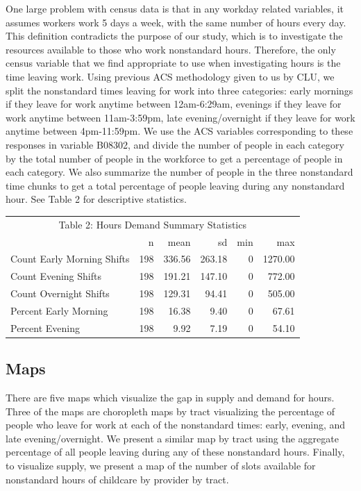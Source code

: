 \documentclass[10pt,letterpaper]{article}
\begin{document}
One large problem with census data is that in any workday related
variables, it assumes workers work 5 days a week, with the same number
of hours every day. This definition contradicts the purpose of our
study, which is to investigate the resources available to those who work
nonstandard hours. Therefore, the only census variable that we find
appropriate to use when investigating hours is the time leaving work.
Using previous ACS methodology given to us by CLU, we split the
nonstandard times leaving for work into three categories: early mornings
if they leave for work anytime between 12am-6:29am, evenings if they
leave for work anytime between 11am-3:59pm, late evening/overnight if
they leave for work anytime between 4pm-11:59pm. We use the ACS
variables corresponding to these responses in variable B08302, and
divide the number of people in each category by the total number of
people in the workforce to get a percentage of people in each category.
We also summarize the number of people in the three nonstandard time
chunks to get a total percentage of people leaving during any
nonstandard hour. See Table 2 for descriptive statistics.

\begin{table}[!h]
\centering\begingroup\fontsize{10}{12}\selectfont

\begin{tabular}{l|r|r|r|r|r}
\hline
\multicolumn{6}{c|}{Table 2: Hours Demand Summary Statistics} \\
\cline{1-6}
  & n & mean & sd & min & max\\
\hline
\rowcolor{gray!6}  Count Early Morning Shifts & 198 & 336.56 & 263.18 & 0 & 1270.00\\
\hline
Count Evening Shifts & 198 & 191.21 & 147.10 & 0 & 772.00\\
\hline
\rowcolor{gray!6}  Count Overnight Shifts & 198 & 129.31 & 94.41 & 0 & 505.00\\
\hline
Percent Early Morning & 198 & 16.38 & 9.40 & 0 & 67.61\\
\hline
\rowcolor{gray!6}  Percent Evening & 198 & 9.92 & 7.19 & 0 & 54.10\\
\hline
\end{tabular}
\endgroup{}
\end{table}

\subsection{Maps}\label{maps-1}

There are five maps which visualize the gap in supply and demand for
hours. Three of the maps are choropleth maps by tract visualizing the
percentage of people who leave for work at each of the nonstandard
times: early, evening, and late evening/overnight. We present a similar
map by tract using the aggregate percentage of all people leaving during
any of these nonstandard hours. Finally, to visualize supply, we present
a map of the number of slots available for nonstandard hours of
childcare by provider by tract.
\end{document}
